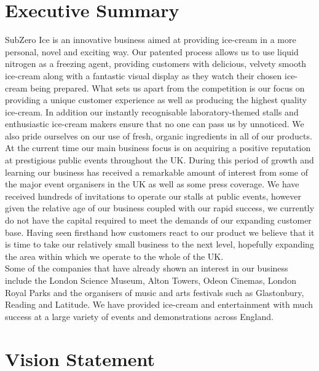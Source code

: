 \documentclass{article}
\begin{document}
\pagebreak


\section{Executive Summary}

SubZero Ice is an innovative business aimed at providing ice-cream in a more personal, novel and exciting way. Our patented process allows us to use liquid nitrogen as a freezing agent, providing customers with delicious, velvety smooth ice-cream along with a fantastic visual display as they watch their chosen ice-cream being prepared. What sets us apart from the competition is our focus on providing a unique customer experience as well as producing the highest quality ice-cream. In addition our instantly recognisable laboratory-themed stalls and enthusiastic ice-cream makers ensure that no one can pass us by unnoticed. We also pride ourselves on our use of fresh, organic ingredients in all of our products. \\

At the current time our main business focus is on acquiring a positive reputation at prestigious public events throughout the UK. During this period of growth and learning our business has received a remarkable amount of interest from some of the major event organisers in the UK as well as some press coverage. We have received hundreds of invitations to operate our stalls at public events, however given the relative age of our business coupled with our rapid success, we currently do not have the capital required to meet the demands of our expanding customer base. Having seen firsthand how customers react to our product we believe that it is time to take our relatively small business to the next level, hopefully expanding the area within which we operate to the whole of the UK. \\

Some of the companies that have already shown an interest in our business include the London Science Museum, Alton Towers, Odeon Cinemas, London Royal Parks and the organisers of music and arts festivals such as Glastonbury, Reading and Latitude. We have provided ice-cream and entertainment with much success at a large variety of events and demonstrations across England.


\section{Vision Statement}
\end{document}
